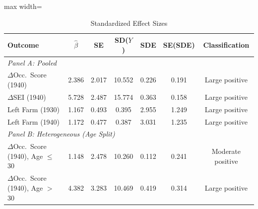 \begin{table}[t]
\centering
\caption{Standardized Effect Sizes}
\label{tab:sde}
\begin{adjustbox}{max width=\textwidth}
\begin{tabular}{lcccccc}
\toprule
Outcome & $\hat{\beta}$ & SE & SD($Y$) & SDE & SE(SDE) & Classification \\
\midrule
\multicolumn{7}{l}{\textit{Panel A: Pooled}} \\
$\Delta$Occ.~Score (1940) & 2.386 & 2.017 & 10.552 & 0.226 & 0.191 & Large positive \\
$\Delta$SEI (1940) & 5.728 & 2.487 & 15.774 & 0.363 & 0.158 & Large positive \\
Left Farm (1930) & 1.167 & 0.493 & 0.395 & 2.955 & 1.249 & Large positive \\
Left Farm (1940) & 1.172 & 0.477 & 0.387 & 3.031 & 1.235 & Large positive \\
\midrule
\multicolumn{7}{l}{\textit{Panel B: Heterogeneous (Age Split)}} \\
$\Delta$Occ.~Score (1940), Age $\leq$ 30 & 1.148 & 2.478 & 10.260 & 0.112 & 0.241 & Moderate positive \\
$\Delta$Occ.~Score (1940), Age $>$ 30 & 4.382 & 3.283 & 10.469 & 0.419 & 0.314 & Large positive \\
\bottomrule
\end{tabular}
\end{adjustbox}
\par\vspace{0.3em}
{\footnotesize
}
\end{table}
